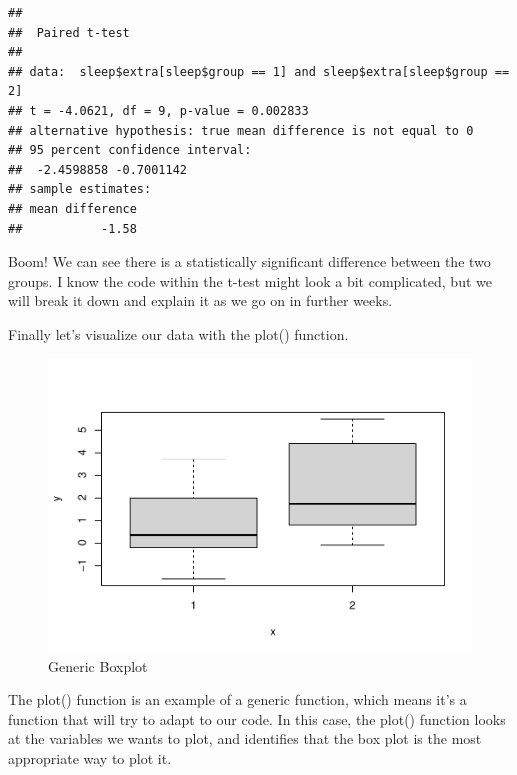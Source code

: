 \documentclass[
]{book}
\newenvironment{Shaded}{\begin{snugshade}}{\end{snugshade}}
\newcommand{\FunctionTok}[1]{\textcolor[rgb]{0.13,0.29,0.53}{\textbf{#1}}}
\newcommand{\NormalTok}[1]{#1}
\newcommand{\SpecialCharTok}[1]{\textcolor[rgb]{0.81,0.36,0.00}{\textbf{#1}}}
\begin{document}
\begin{verbatim}
## 
##  Paired t-test
## 
## data:  sleep$extra[sleep$group == 1] and sleep$extra[sleep$group == 2]
## t = -4.0621, df = 9, p-value = 0.002833
## alternative hypothesis: true mean difference is not equal to 0
## 95 percent confidence interval:
##  -2.4598858 -0.7001142
## sample estimates:
## mean difference 
##           -1.58
\end{verbatim}

Boom! We can see there is a statistically significant difference between the two groups. I know the code within the t-test might look a bit complicated, but we will break it down and explain it as we go on in further weeks.

Finally let's visualize our data with the plot() function.

\begin{Shaded}
\end{Shaded}

\begin{figure}
\centering
\includegraphics{gitbook-demo_files/figure-latex/unnamed-chunk-8-1.pdf}
\caption{\label{fig:unnamed-chunk-8}Generic Boxplot}
\end{figure}

The plot() function is an example of a generic function, which means it's a function that will try to adapt to our code. In this case, the plot() function looks at the variables we wants to plot, and identifies that the box plot is the most appropriate way to plot it.
\end{document}
